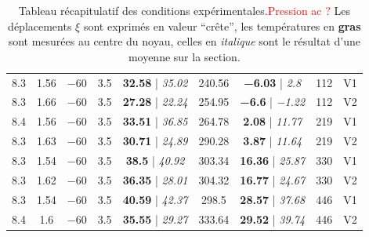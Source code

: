 \begin{table}[!ht]
\begin{tabular}{ccccccccc}
		\num{8.3} & \num{1.56} & \num{-60} & \num{3.5} & \textbf{\num{32.58}} | \textit{\num{35.02}} & \num{240.56} &\textbf{\num{-6.03}} | \textit{\num{2.8}}  & \num{112} & V1 \\
		\num{8.3} & \num{1.66} & \num{-60} & \num{3.5} & \textbf{\num{27.28}} | \textit{\num{22.24}} & \num{254.95} & \textbf{\num{-6.6}} | \textit{\num{-1.22}} & \num{112} & V2 \\
		\num{8.4} & \num{1.56} & \num{-60} & \num{3.5} & \textbf{\num{33.51}} | \textit{\num{36.85}} & \num{264.78} & \textbf{\num{2.08}} | \textit{\num{11.77}} & \num{219} & V1 \\
		\num{8.3} & \num{1.63} & \num{-60} & \num{3.5} & \textbf{\num{30.71}} | \textit{\num{24.89}} & \num{290.28} & \textbf{\num{3.87}} | \textit{\num{11.64}} & \num{219} & V2 \\
		\num{8.3} & \num{1.54} & \num{-60} & \num{3.5} & \textbf{\num{38.5}} | \textit{\num{40.92}} & \num{303.34} & \textbf{\num{16.36}} | \textit{\num{25.87}} & \num{330} & V1 \\
		\num{8.3} & \num{1.62} & \num{-60} & \num{3.5} & \textbf{\num{36.35}} | \textit{\num{28.01}} & \num{304.32} & \textbf{\num{16.77}} | \textit{\num{24.67}} & \num{330} & V2 \\
		\num{8.3} & \num{1.54} & \num{-60} & \num{3.5} & \textbf{\num{40.59}} | \textit{\num{42.37}} & \num{298.5} & \textbf{\num{28.57}} | \textit{\num{37.68}} & \num{446} & V1 \\
		\num{8.4} & \num{1.6} & \num{-60} & \num{3.5} & \textbf{\num{35.55}} | \textit{\num{29.27}} & \num{333.64} & \textbf{\num{29.52}} | \textit{\num{39.74}} & \num{446} & V2 \\%
\hline
	\end{tabular} %
	\caption{Tableau récapitulatif des conditions expérimentales.\textcolor{red}{Pression ac  ?} Les déplacements $\xi$ sont exprimés en valeur ``crête'', les températures en \textbf{gras} sont mesurées au centre du noyau, celles en \textit{italique} sont le résultat d'une moyenne sur la section.}
	\label{tab:RecapCondExpe}
\end{table}


